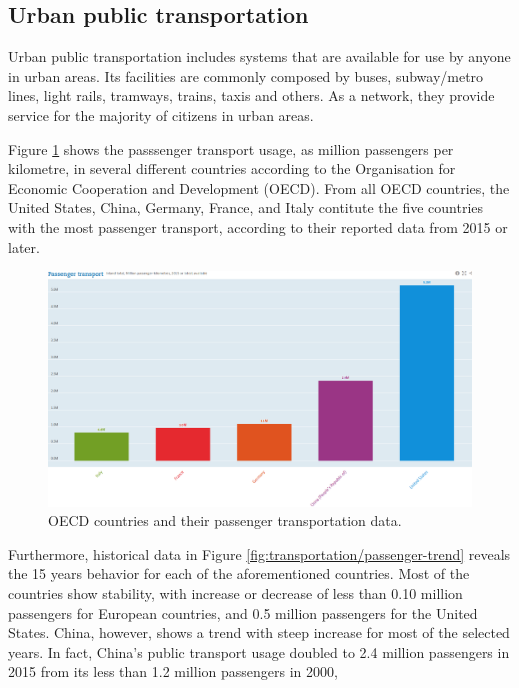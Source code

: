 \documentclass{article}
\begin{document}
\subsection{Urban public transportation}
Urban public transportation includes systems that are available for use by anyone in urban areas. Its facilities are commonly composed by buses, subway/metro lines, light rails, tramways, trains, taxis and others. As a network, they provide service for the majority of citizens in urban areas.\citep{vuchic1900urban}

Figure \ref{fig:transportation/passenger} shows the passsenger transport usage, as million passengers per kilometre, in several different countries according to the Organisation for Economic Cooperation and Development (OECD). From all OECD countries, the United States, China, Germany, France, and Italy contitute the five countries with the most passenger transport, according to their reported data from 2015 or later.\cite{OECD2017passenger} 

\begin{figure}[H]
  	\centering
  	\includegraphics[width=\linewidth]{./images/OECD_passengers_absolute.png}
  	\caption{OECD countries and their passenger transportation data.}
  	\label{fig:transportation/passenger}
\end{figure}

Furthermore, historical data in Figure \ref{fig:transportation/passenger-trend} reveals the 15 years behavior for each of the aforementioned countries. Most of the countries show stability, with increase or decrease of less than 0.10 million passengers for European countries, and 0.5 million passengers for the United States. China, however, shows a trend with steep increase for most of the selected years. In fact, China's public transport usage doubled to 2.4 million passengers in 2015 from its less than 1.2 million passengers in 2000, 
  
\end{document}
